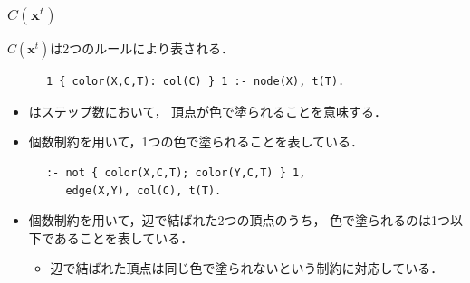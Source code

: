 \documentclass[dvipdfmx,11pt]{beamer}
\begin{document}
\begin{frame}[fragile]\frametitle{$C(\bm{x}^t)$}

  $C(\bm{x}^t)$は2つのルールにより表される．
  
  \begin{exampleblock}{}
    \begin{lstlisting}
      1 { color(X,C,T): col(C) } 1 :- node(X), t(T).
    \end{lstlisting}
  \end{exampleblock}
  \begin{itemize}
    \item {}はステップ数において，
          頂点が色で塗られることを意味する．
    \item 個数制約を用いて，1つの色で塗られることを表している．
  \end{itemize}

  \begin{exampleblock}{}
    \begin{lstlisting}
      :- not { color(X,C,T); color(Y,C,T) } 1, 
         edge(X,Y), col(C), t(T).
    \end{lstlisting}
  \end{exampleblock}
  \begin{itemize}
    \item 個数制約を用いて，辺で結ばれた2つの頂点のうち，
          色で塗られるのは1つ以下であることを表している．
          \begin{itemize}
            \item 辺で結ばれた頂点は同じ色で塗られないという制約に対応している．
          \end{itemize}
  \end{itemize}

\end{frame}
\end{document}
